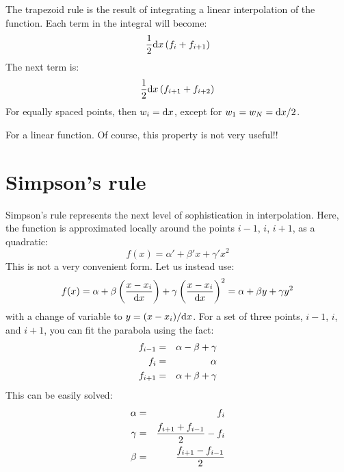 The trapezoid rule is the result of integrating a linear interpolation
of the function. Each term in the integral will become:
\begin{equation}
\frac{1}{2} {\rm d}x \left( f_i + f_{i+1} \right) 
\end{equation}
The next term is:
\begin{equation}
\frac{1}{2} {\rm d}x \left( f_{i+1} + f_{i+2} \right) 
\end{equation}
For equally spaced points, then $w_i = {\rm d}x$, except for $w_1=
w_{N} = {\rm d}x/2$.


\begin{answer}
For a linear function. Of course, this property is not very useful!!
\end{answer}

\section{Simpson's rule}

Simpson's rule represents the next level of sophistication in
interpolation. Here, the function is approximated locally around the
points $i-1$, $i$, $i+1$, as a quadratic:
\begin{equation}
f(x) = \alpha' + \beta' x + \gamma' x^2
\end{equation}
This is not a very convenient form. Let us instead use:
\begin{equation}
  f(x) = \alpha + \beta \left(\frac{x - x_i}{{\rm d}x}\right) +
  \gamma \left(\frac{x - x_i}{{\rm d}x}\right)^2 = 
  \alpha + \beta y
  + \gamma y^2
\end{equation}
with a change of variable to $y = (x-x_i)/{\rm d}x$.  For a set of
three points, $i-1$, $i$, and $i+1$, you can fit the parabola using
the fact:
\begin{eqnarray}
f_{i-1} &=& \alpha - \beta + \gamma \cr
f_{i} &=& \alpha \cr
f_{i+1} &=& \alpha + \beta + \gamma
\end{eqnarray}
This can be easily solved:
\begin{eqnarray}
\alpha &=& f_i \cr
\gamma &=& \frac{f_{i+1}+f_{i-1}}{2} - f_i \cr
\beta &=& \frac{f_{i+1}-f_{i-1}}{2}
\end{eqnarray}


